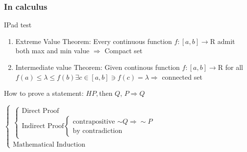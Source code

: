 


\cfoot{\thepage} %

\subsubsection{In calculus}

IPad test

\begin{enumerate}
	\item Extreme Value Theorem: Every continuous function $f:[a,b]\rightarrow\mathrm{R}$ admit both max and min value $\Rightarrow$ Compact set
	\item Intermediate value Theorem: Given continous function $f:[a,b]\rightarrow \mathrm{R}$ for all $f(a) \leq \lambda \leq f(b) \exists c \in [a,b] \ni f(c) = \lambda \Rightarrow$ connected set
\end{enumerate}

How to prove a statement: $H P,$then $Q$, $P \Rightarrow Q$

$\begin{cases}
	\begin{cases}
	\text{Direct Proof}\\\text{Indirect Proof}\begin{cases}\text{contrapositive $\sim Q \Rightarrow \sim P$} \\ \text{by contradiction}\end{cases}
	\end{cases}\\
	\text{Mathematical Induction}
\end{cases}$


\newpage


\newpage



